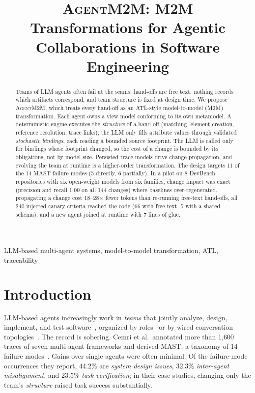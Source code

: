 \documentclass[10pt,conference]{IEEEtran}
\theoremstyle{definition}
\newcommand{\tool}{\textsc{AgentM2M}}
\begin{document}
\title{\textsc{AgentM2M}: M2M Transformations for Agentic Collaborations in Software Engineering}


\maketitle


\begin{abstract}
Teams of LLM agents often fail at the seams: hand-offs are free text,
nothing records which artifacts correspond, and team structure is fixed at
design time. We propose \tool{}, which treats every
hand-off as an ATL-style model-to-model (M2M) transformation. Each agent
owns a view model conforming to its own metamodel. A deterministic engine
executes the \emph{structure} of a hand-off (matching, element creation,
reference resolution, trace links); the LLM only fills attribute values
through validated \emph{stochastic bindings}, each reading a bounded source
footprint. The LLM is called only for bindings whose footprint changed, so
the cost of a change is bounded by its obligations, not by model size.
Persisted trace models drive change propagation, and evolving the team at
runtime is a higher-order transformation. The design targets 11 of the 14
MAST failure modes (5 directly, 6 partially). In a pilot on 8 DevBench
repositories with six open-weight models from six families, change impact
was exact (precision and recall 1.00 on all 144 changes) where baselines
over-regenerated, propagating a change cost 18--28$\times$ fewer tokens
than re-running free-text hand-offs, all 240 injected canary criteria
reached the code (66 with free text, 5 with a shared schema), and a new
agent joined at runtime with 7 lines of glue.
\end{abstract}

\begin{IEEEkeywords}
LLM-based multi-agent systems, model-to-model transformation, ATL,
traceability
\end{IEEEkeywords}

\section{Introduction}\label{sec:introduction}

LLM-based agents increasingly work in \emph{teams} that jointly analyze,
design, implement, and test software~\cite{he2025lma}, organized by
roles~\cite{hong2024metagpt,qian2024chatdev,tao2024magis} or by wired
conversation topologies~\cite{wu2024autogen,li2023camel,chen2024agentverse}.
The record is sobering. Cemri et al.\ annotated more than 1{,}600
traces of seven multi-agent frameworks and derived MAST, a taxonomy of 14
failure modes~\cite{cemri2025mast}. Gains over single agents were often
minimal. Of the failure-mode occurrences they report, 44.2\% are
\emph{system design issues}, 32.3\% \emph{inter-agent misalignment}, and
23.5\% \emph{task verification}; in their case studies, changing only the
team's \emph{structure} raised task success substantially.
\end{document}
